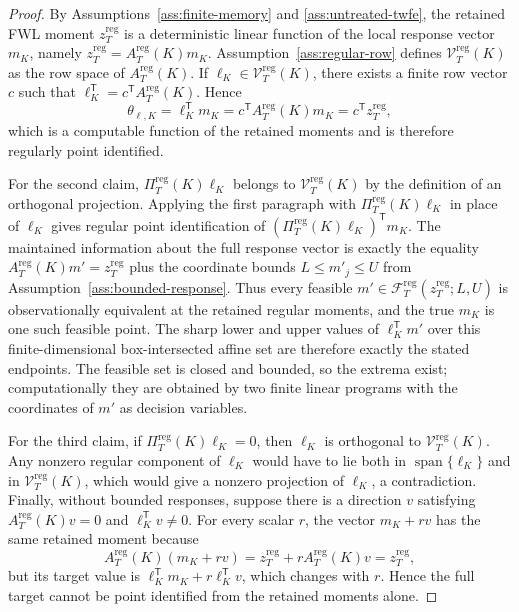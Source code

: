 \documentclass[11pt]{article}
\newcommand{\transpose}{\mathsf{T}}
\theoremstyle{definition}
\theoremstyle{plain}
\theoremstyle{remark}
\begin{document}
\begin{proof}
By Assumptions~\ref{ass:finite-memory} and \ref{ass:untreated-twfe}, the retained FWL moment \(z_T^{\mathrm{reg}}\) is a deterministic linear function of the local response vector \(m_K\), namely \(z_T^{\mathrm{reg}}=A_T^{\mathrm{reg}}(K)m_K\). Assumption~\ref{ass:regular-row} defines \(\mathcal V_T^{\mathrm{reg}}(K)\) as the row space of \(A_T^{\mathrm{reg}}(K)\). If \(\ell_K\in\mathcal V_T^{\mathrm{reg}}(K)\), there exists a finite row vector \(c\) such that \(\ell_K^\transpose=c^\transpose A_T^{\mathrm{reg}}(K)\). Hence
\[
\theta_{\ell,K}=\ell_K^\transpose m_K=c^\transpose A_T^{\mathrm{reg}}(K)m_K=c^\transpose z_T^{\mathrm{reg}},
\]
which is a computable function of the retained moments and is therefore regularly point identified.

For the second claim, \(\Pi_T^{\mathrm{reg}}(K)\ell_K\) belongs to \(\mathcal V_T^{\mathrm{reg}}(K)\) by the definition of an orthogonal projection. Applying the first paragraph with \(\Pi_T^{\mathrm{reg}}(K)\ell_K\) in place of \(\ell_K\) gives regular point identification of \((\Pi_T^{\mathrm{reg}}(K)\ell_K)^\transpose m_K\). The maintained information about the full response vector is exactly the equality \(A_T^{\mathrm{reg}}(K)m'=z_T^{\mathrm{reg}}\) plus the coordinate bounds \(L\le m'_j\le U\) from Assumption~\ref{ass:bounded-response}. Thus every feasible \(m'\in\mathcal F_T^{\mathrm{reg}}(z_T^{\mathrm{reg}};L,U)\) is observationally equivalent at the retained regular moments, and the true \(m_K\) is one such feasible point. The sharp lower and upper values of \(\ell_K^\transpose m'\) over this finite-dimensional box-intersected affine set are therefore exactly the stated endpoints. The feasible set is closed and bounded, so the extrema exist; computationally they are obtained by two finite linear programs with the coordinates of \(m'\) as decision variables.

For the third claim, if \(\Pi_T^{\mathrm{reg}}(K)\ell_K=0\), then \(\ell_K\) is orthogonal to \(\mathcal V_T^{\mathrm{reg}}(K)\). Any nonzero regular component of \(\ell_K\) would have to lie both in \(\operatorname{span}\{\ell_K\}\) and in \(\mathcal V_T^{\mathrm{reg}}(K)\), which would give a nonzero projection of \(\ell_K\), a contradiction. Finally, without bounded responses, suppose there is a direction \(v\) satisfying \(A_T^{\mathrm{reg}}(K)v=0\) and \(\ell_K^\transpose v\ne0\). For every scalar \(r\), the vector \(m_K+rv\) has the same retained moment because
\[
A_T^{\mathrm{reg}}(K)(m_K+rv)=z_T^{\mathrm{reg}}+rA_T^{\mathrm{reg}}(K)v=z_T^{\mathrm{reg}},
\]
but its target value is \(\ell_K^\transpose m_K+r\ell_K^\transpose v\), which changes with \(r\). Hence the full target cannot be point identified from the retained moments alone.
\end{proof}
\end{document}

